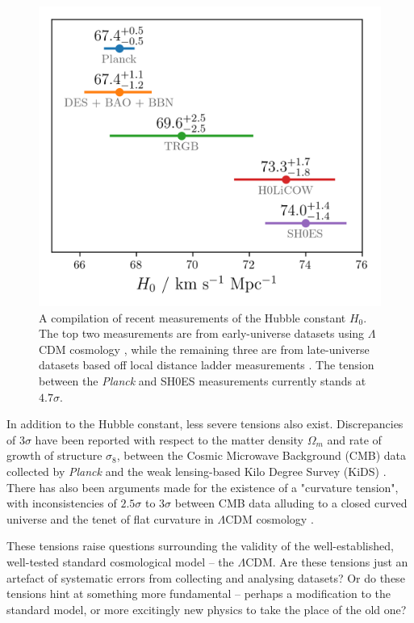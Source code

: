 \documentclass[%
 reprint,
 amsmath,amssymb,
 aps,
]{revtex4-2}
\begin{document}
\begin{figure}
    \includegraphics[width=0.8\columnwidth]{../plots/H0 tension.png}
    \centering
    \caption{A compilation of recent measurements of the Hubble constant $H_0$. The top two measurements are from early-universe datasets using $\Lambda$CDM cosmology \cite{Planck2020, Abbott2018}, while the remaining three are from late-universe datasets based off local distance ladder measurements \cite{Freedman2020, Riess2019, Wong2019}. The tension between the \textit{Planck} and SH0ES measurements currently stands at $4.7 \sigma$.}
    \label{H0_tension}
\end{figure}


In addition to the Hubble constant, less severe tensions also exist. Discrepancies of $3\sigma$ have been reported with respect to the matter density $\Omega_m$ and rate of growth of structure $\sigma_8$, between the Cosmic Microwave Background (CMB) data collected by \textit{Planck} and the weak lensing-based Kilo Degree Survey (KiDS) \cite{Heymans2021}. There has also been arguments made for the existence of a "curvature tension", with inconsistencies of $2.5 \sigma$ to $3 \sigma$ between CMB data alluding to a closed curved universe and the tenet of flat curvature in $\Lambda$CDM cosmology \cite{Handley2021Closed}.

These tensions raise questions surrounding the validity of the well-established, well-tested standard cosmological model -- the $\Lambda$CDM. Are these tensions just an artefact of systematic errors from collecting and analysing datasets? Or do these tensions hint at something more fundamental -- perhaps a modification to the standard model, or more excitingly new physics to take the place of the old one?
\end{document}
